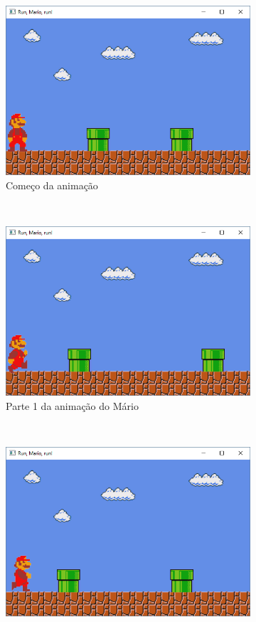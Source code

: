 \begin{enumerate}
  \begin{figure}[!htp]
    \centering
    \begin{subfigure}[b]{0.3\textwidth}
        \centerline{\includegraphics[width=.9\textwidth]{img/cap1_ex25}}
        \caption{Começo da animação}
        \label{fig:cap01_ex6a}
    \end{subfigure}
    ~
    \begin{subfigure}[b]{0.3\textwidth}
        \centerline{\includegraphics[width=.9\textwidth]{img/cap1_ex25b}}
        \caption{Parte 1 da animação do Mário}
        \label{fig:cap01_ex6b}
    \end{subfigure}
    ~
    \begin{subfigure}[b]{0.3\textwidth}
        \centerline{\includegraphics[width=.9\textwidth]{img/cap1_ex25c}}

\end{subfigure}
\end{figure}
\end{enumerate}
